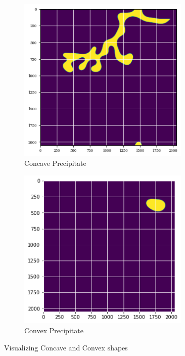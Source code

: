 \documentclass[12pt, a4paper]{report}
\begin{document}
\begin{figure}[H]
\centering
\begin{subfigure}{.45\textwidth}
  \centering
  \includegraphics[width=0.9\textwidth]{Pictures/MSFeatures/ExampleConcavePPT.png}
  \caption{Concave Precipitate}
  \label{img:microstrImg}
\end{subfigure}
\begin{subfigure}{.45\textwidth}
  \centering
  \includegraphics[width=0.9\textwidth]{Pictures/MSFeatures/ExampleConvexPPT.png}
  \caption{Convex Precipitate}
  \label{img:microstrImg}
\end{subfigure}
\caption{Visualizing Concave and Convex shapes}
\label{fig:test}
\end{figure}
\end{document}
